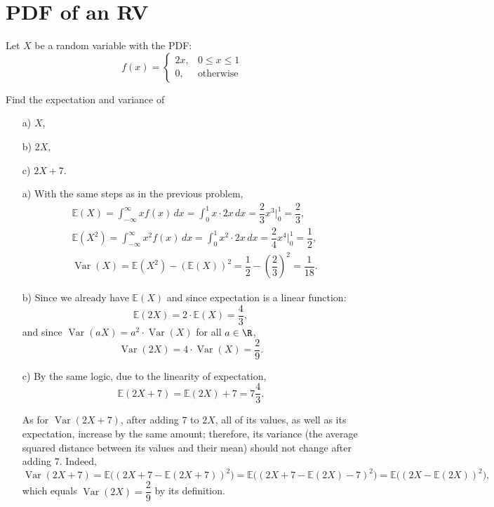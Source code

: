 \section{PDF of an RV}
\begin{problem} %
   Let $X$ be a random variable with the PDF:
   \[
   f(x) = \begin{cases}
       2x, & 0 \le x \le 1 \\
       0, & \text{otherwise}
   \end{cases}
   \]

   Find the expectation and variance of
   \begin{enumerate}
       \item[a) ] $X$,
       \item[b) ] $2X$,
       \item[c) ] $2X + 7$. 
       
   \end{enumerate}
\end{problem}
\bigskip
\begin{solution} %
\begin{enumerate}
    \item[a) ] With the same steps as in the previous problem,
    \begin{align*}
    & \mathbb{E}(X) = \int_{-\infty}^\infty xf(x)\,dx
                     = \int_{0}^1 x\cdot 2x \, dx
                     = \dfrac{2}{3} x^3\bigg\vert_{0}^{1} = \dfrac{2}{3},
    \\
    & \mathbb{E}(X^2) = \int_{-\infty}^\infty x^2f(x)\,dx
                     = \int_{0}^1 x^2\cdot 2x \, dx
                     = \dfrac{2}{4} x^4\bigg\vert_{0}^{1} = \dfrac{1}{2},
    \\
    & \operatorname{Var}(X) =\mathbb{E}(X^2) - (\mathbb{E}(X))^2= \dfrac{1}{2}-\left(\dfrac{2}{3}\right)^2 = \dfrac{1}{18}.
    \end{align*}
    
    \item[b) ] Since we already have $\mathbb{E}(X)$ and since expectation is a linear function:
    \[
    \mathbb{E}(2X) = 2 \cdot \mathbb{E}(X) = \dfrac{4}{3},
    \]
    and since $\operatorname{Var}(aX)=a^2\cdot \operatorname{Var}(X)$ for all $a\in\R$,
    \[
    \operatorname{Var}(2X) = 4\cdot\operatorname{Var}(X) = \dfrac{2}{9}.
    \]
        
    \item[c) ] By the same logic, due to the linearity of expectation,
    \[
    \mathbb{E}(2X+7)=\mathbb{E}(2X)+7= 7\dfrac{4}{3}.
    \]

    As for $\operatorname{Var}(2X+7)$, after adding $7$ to $2X$, all of its values, as well as its expectation, increase by the same amount; therefore, its variance (the average squared distance between its values and their mean) should not change after adding $7$. Indeed,
    \[
    \operatorname{Var}(2X+7) = \mathbb{E}\big((2X+7 - \mathbb{E}(2X+7))^2\big) 
     = \mathbb{E}\big((2X+7 - \mathbb{E}(2X) - 7)^2\big) 
     = \mathbb{E}\big((2X- \mathbb{E}(2X) )^2\big),
    \]
    which equals $\operatorname{Var}(2X) = \dfrac{2}{9}$ by its definition.
    
\end{enumerate}
\end{solution}
